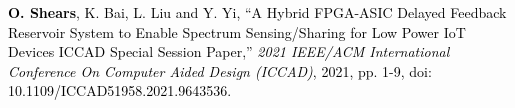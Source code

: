 


\textcolor{black}{
\textbf{O. Shears}, K. Bai, L. Liu and Y. Yi, ``A Hybrid FPGA-ASIC Delayed Feedback Reservoir System to Enable Spectrum Sensing/Sharing for Low Power IoT Devices ICCAD Special Session Paper,'' \emph{2021 IEEE/ACM International Conference On Computer Aided Design (ICCAD)}, 2021, pp. 1-9, doi: 10.1109/ICCAD51958.2021.9643536.
}








